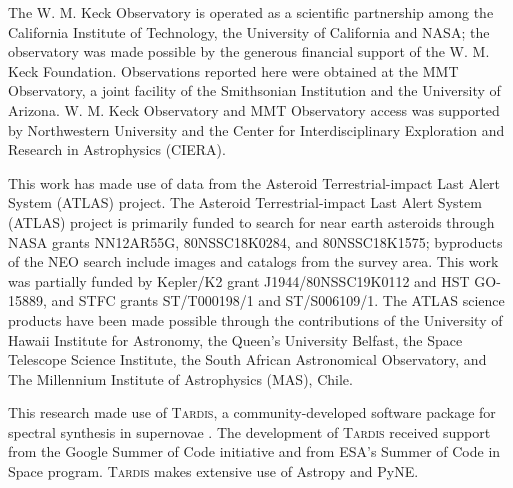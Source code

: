 \documentclass[twocolumn]{aastex631}
\begin{document}
\begin{CJK*}{UTF8}{gbsn}
The W. M. Keck Observatory is operated as a scientific partnership among the California Institute of Technology, the University of California and NASA; the observatory was made possible by the generous financial support of the W. M. Keck Foundation. Observations reported here were obtained at the MMT Observatory, a joint facility of the Smithsonian Institution and the University of Arizona. W. M. Keck Observatory and MMT Observatory access was supported by Northwestern University and the Center for Interdisciplinary Exploration and Research in Astrophysics (CIERA).

This work has made use of data from the Asteroid Terrestrial-impact Last Alert System (ATLAS) project. The Asteroid Terrestrial-impact Last Alert System (ATLAS) project is primarily funded to search for near earth asteroids through NASA grants NN12AR55G, 80NSSC18K0284, and 80NSSC18K1575; byproducts of the NEO search include images and catalogs from the survey area. This work was partially funded by Kepler/K2 grant J1944/80NSSC19K0112 and HST GO-15889, and STFC grants ST/T000198/1 and ST/S006109/1. The ATLAS science products have been made possible through the contributions of the University of Hawaii Institute for Astronomy, the Queen's University Belfast, the Space Telescope Science Institute, the South African Astronomical Observatory, and The Millennium Institute of Astrophysics (MAS), Chile.

This research made use of \textsc{Tardis}, a community-developed software package for spectral synthesis in supernovae \citep{Tardis_2014, tardis-sn_2019}. The development of \textsc{Tardis} received support from the Google Summer of Code initiative and from ESA's Summer of Code in Space program. \textsc{Tardis} makes extensive use of Astropy and PyNE.





\end{CJK*}
\end{document}
